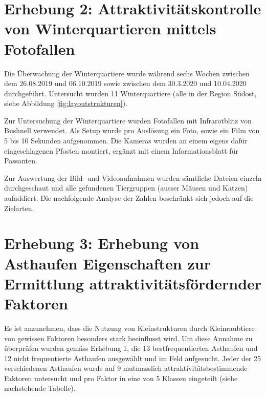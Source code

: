 \documentclass[
  oneside]{scrbook}
\begin{document}
\hypertarget{erhebung-2-attraktivituxe4tskontrolle-von-winterquartieren-mittels-fotofallen}{%
\section{Erhebung 2: Attraktivitätskontrolle von Winterquartieren mittels Fotofallen}\label{erhebung-2-attraktivituxe4tskontrolle-von-winterquartieren-mittels-fotofallen}}

Die Überwachung der Winterquartiere wurde während sechs Wochen zwischen dem 26.08.2019 und 06.10.2019 sowie zwischen dem 30.3.2020 und 10.04.2020 durchgeführt. Untersucht wurden 11 Winterquartiere (alle in der Region Südost, siehe Abbildung \ref{fig:layoutstrukturen}).

Zur Untersuchung der Winterquartiere wurden Fotofallen mit Infrarotblitz von Bushnell verwendet. Als Setup wurde pro Auslösung ein Foto, sowie ein Film von 5 bis 10 Sekunden aufgenommen. Die Kameras wurden an einem eigens dafür eingeschlagenen Pfosten montiert, ergänzt mit einem Informationsblatt für Passanten.

Zur Auswertung der Bild- und Videoaufnahmen wurden sämtliche Dateien einzeln durchgeschaut und alle gefundenen Tiergruppen (ausser Mäusen und Katzen) aufaddiert. Die nachfolgende Analyse der Zahlen beschränkt sich jedoch auf die Zielarten.

\hypertarget{erhebung-3-erhebung-von-asthaufen-eigenschaften-zur-ermittlung-attraktivituxe4tsfuxf6rdernder-faktoren}{%
\section{Erhebung 3: Erhebung von Asthaufen Eigenschaften zur Ermittlung attraktivitätsfördernder Faktoren}\label{erhebung-3-erhebung-von-asthaufen-eigenschaften-zur-ermittlung-attraktivituxe4tsfuxf6rdernder-faktoren}}

Es ist anzunehmen, dass die Nutzung von Kleinstrukturen durch Kleinraubtiere von gewissen Faktoren besonders stark beeinflusst wird.
Um diese Annahme zu überprüfen wurden gemäss Erhebung 1, die 13 bestfrequentierten Asthaufen und 12 nicht frequentierte Asthaufen ausgewählt und im Feld aufgesucht. Jeder der 25 verschiedenen Asthaufen wurde auf 9 mutmasslich attraktivitätsbestimmende Faktoren untersucht und pro Faktor in eine von 5 Klassen eingeteilt (siehe nachstehende Tabelle).
\end{document}

